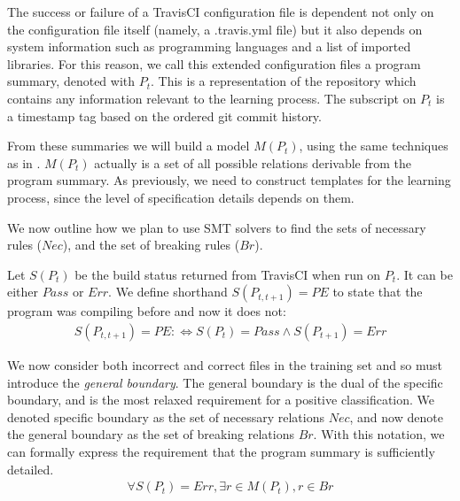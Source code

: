 The success or failure of a TravisCI configuration file is dependent
not only on the configuration file itself (namely, a .travis.yml file) but it also depends on system information such as programming languages and a list of imported libraries.
For this reason, we call this extended configuration files a program summary, denoted with $P_t$. This is a representation 
of the repository which contains any information 
relevant to the learning process.
The subscript on $P_t$ is a timestamp tag based on 
the ordered git commit history.


From these summaries we will build a model $M(P_t)$, using the same techniques as in 
\app. $M(P_t)$ actually is a set of all possible relations derivable 
from the program summary. As previously, we need to construct templates for the 
learning process, since the level of specification details depends on them.

We now outline how we plan to use SMT solvers to find the sets of necessary rules ($Nec$), and the set of breaking rules ($Br$).

Let $S(P_t)$ be the build status returned from TravisCI when run on $P_t$.
It can be either $Pass$ or $Err$. We define shorthand $S(P_{t,t+1}) = PE$ to 
state that the program was compiling before and now it does not:
\begin{align*}
  S(P_{t,t+1}) = PE :\Leftrightarrow S(P_t)=Pass \land S(P_{t+1})=Err 
\end{align*}

We now consider both incorrect and correct files in the training set 
and so must introduce the \textit{general boundary}.
The general boundary is the dual of the specific boundary, and is the most relaxed requirement for a positive classification.
We denoted specific boundary as the set of necessary relations $Nec$, and now denote the general boundary as the set of breaking relations $Br$.
With this notation, we can formally express the requirement that the program summary is sufficiently detailed.
\begin{align}
  \forall S(P_t)=Err, \exists r \in M(P_t), r \in Br \label{eq:E1}
\end{align}

